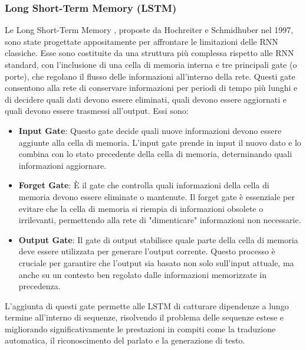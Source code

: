 \subsubsection{Long Short-Term Memory (LSTM)}
Le Long Short-Term Memory \cite{10.1162/neco.1997.9.8.1735,sak2014longshorttermmemorybased,cheng2016longshorttermmemorynetworksmachine}, proposte da Hochreiter e Schmidhuber nel 1997, sono state progettate appositamente per affrontare le limitazioni delle RNN classiche. Esse sono costituite da una struttura più complessa rispetto alle RNN standard, con l'inclusione di una cella di memoria interna e tre principali gate (o porte), che regolano il flusso delle informazioni all'interno della rete. Questi gate consentono alla rete di conservare informazioni per periodi di tempo più lunghi e di decidere quali dati devono essere eliminati, quali devono essere aggiornati e quali devono essere trasmessi all'output. Essi sono:
\begin{itemize}
	\item \textbf{Input Gate}: Questo gate decide quali nuove informazioni devono essere aggiunte alla cella di memoria. L'input gate prende in input il nuovo dato e lo combina con lo stato precedente della cella di memoria, determinando quali informazioni aggiornare.
	\item \textbf{Forget Gate}: È il gate che controlla quali informazioni della cella di memoria devono essere eliminate o mantenute. Il forget gate è essenziale per evitare che la cella di memoria si riempia di informazioni obsolete o irrilevanti, permettendo alla rete di "dimenticare" informazioni non necessarie.
	\item \textbf{Output Gate}: Il gate di output stabilisce quale parte della cella di memoria deve essere utilizzata per generare l'output corrente. Questo processo è cruciale per garantire che l'output sia basato non solo sull'input attuale, ma anche su un contesto ben regolato dalle informazioni memorizzate in precedenza.
\end{itemize}
L'aggiunta di questi gate permette alle LSTM di catturare dipendenze a lungo termine all'interno di sequenze, risolvendo il problema delle sequenze estese e migliorando significativamente le prestazioni in compiti come la traduzione automatica, il riconoscimento del parlato e la generazione di testo.

